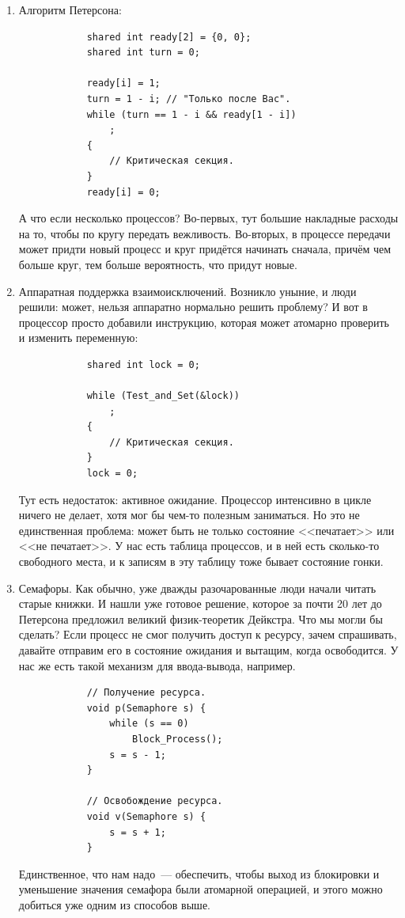 \documentclass{article}
\begin{document}
    \begin{enumerate}
        \addtocounter{enumi}{3}
        \item Алгоритм Петерсона:
        \begin{verbatim}
            shared int ready[2] = {0, 0};
            shared int turn = 0;
            
            ready[i] = 1;
            turn = 1 - i; // "Только после Вас".
            while (turn == 1 - i && ready[1 - i])
                ;
            {
                // Критическая секция.
            }
            ready[i] = 0;
        \end{verbatim}
        А что если несколько процессов? Во-первых, тут большие накладные расходы на то, чтобы по кругу передать вежливость. Во-вторых, в процессе передачи может придти новый процесс и круг придётся начинать сначала, причём чем больше круг, тем больше вероятность, что придут новые.
        \item Аппаратная поддержка взаимоисключений. Возникло уныние, и люди решили: может, нельзя аппаратно нормально решить проблему? И вот в процессор просто добавили инструкцию, которая может атомарно проверить и изменить переменную:
        \begin{verbatim}
            shared int lock = 0;
            
            while (Test_and_Set(&lock))
                ;
            {
                // Критическая секция.
            }
            lock = 0;
        \end{verbatim}
        Тут есть недостаток: активное ожидание. Процессор интенсивно в цикле ничего не делает, хотя мог бы чем-то полезным заниматься. Но это не единственная проблема: может быть не только состояние <<печатает>> или <<не печатает>>. У нас есть таблица процессов, и в ней есть сколько-то свободного места, и к записям в эту таблицу тоже бывает состояние гонки.
        \item Семафоры. Как обычно, уже дважды разочарованные люди начали читать старые книжки. И нашли уже готовое решение, которое за почти 20 лет до Петерсона предложил великий физик-теоретик Дейкстра. Что мы могли бы сделать? Если процесс не смог получить доступ к ресурсу, зачем спрашивать, давайте отправим его в состояние ожидания и вытащим, когда освободится. У нас же есть такой механизм для ввода-вывода, например.
        \begin{verbatim}
            // Получение ресурса.
            void p(Semaphore s) {
                while (s == 0)
                    Block_Process();
                s = s - 1;
            }

            // Освобождение ресурса.
            void v(Semaphore s) {
                s = s + 1;
            }
        \end{verbatim}
        Единственное, что нам надо~--- обеспечить, чтобы выход из блокировки и уменьшение значения семафора были атомарной операцией, и этого можно добиться уже одним из способов выше.
    \end{enumerate}
\end{document}
